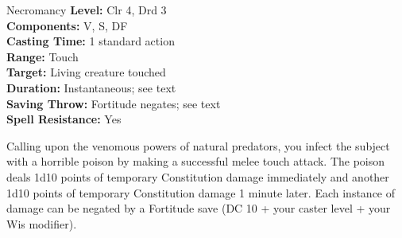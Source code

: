 {Necromancy}
{
	\textbf{Level:}
	Clr 4, Drd 3\\
	\textbf{Components:}
	V, S, DF\\
	\textbf{Casting Time:}
	1 standard action\\
	\textbf{Range:}
	Touch\\
	\textbf{Target:}
	Living creature touched\\
	\textbf{Duration:}
	Instantaneous; see text\\
	\textbf{Saving Throw:}
	Fortitude negates; see text\\
	\textbf{Spell Resistance:}
	Yes\\
}
{
	Calling upon the venomous powers of natural predators, you infect the subject with a horrible poison by making a successful melee touch attack. The poison deals 1d10 points of temporary Constitution damage immediately and another 1d10 points of temporary Constitution damage 1 minute later. Each instance of damage can be negated by a Fortitude save (DC 10 + \onehalf your caster level + your Wis modifier).

}
